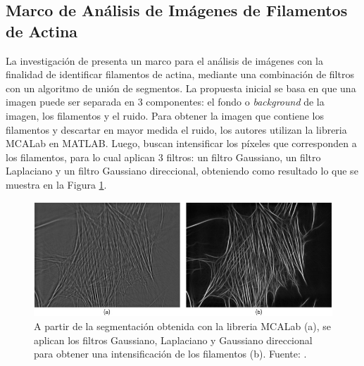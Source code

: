 \subsection{Marco de An\'alisis de Im\'agenes de Filamentos de Actina}
La investigaci\'on de \citet{alioscha2016robust} presenta un marco para el an\'alisis de im\'agenes con la finalidad de identificar filamentos de actina, mediante una combinaci\'on de filtros con un algoritmo de uni\'on de segmentos. La propuesta inicial se basa en que una imagen puede ser separada en 3 componentes: el fondo o {\it background} de la imagen, los filamentos y el ruido. Para obtener la imagen que contiene los filamentos y descartar en mayor medida el ruido, los autores utilizan la libreria MCALab en MATLAB. Luego, buscan intensificar los p\'ixeles que corresponden a los filamentos, para lo cual aplican 3 filtros: un filtro Gaussiano, un filtro Laplaciano y un filtro Gaussiano direccional, obteniendo como resultado lo que se muestra en la Figura \ref{fig:AlioshaRobust}.

\begin{figure}[h]
    \centering
    \includegraphics[scale=2]{imagenes/Aliosha2016-GaussLaplFilters.jpg}
    \caption[Aplicaci\'on de filtros posterior a la segmentaci\'on.]{A partir de la segmentaci\'on obtenida con la libreria MCALab (a), se aplican los filtros Gaussiano, Laplaciano y Gaussiano direccional para obtener una intensificaci\'on de los filamentos (b). Fuente: \citet{alioscha2016robust}.}
    \label{fig:AlioshaRobust}
\end{figure}


